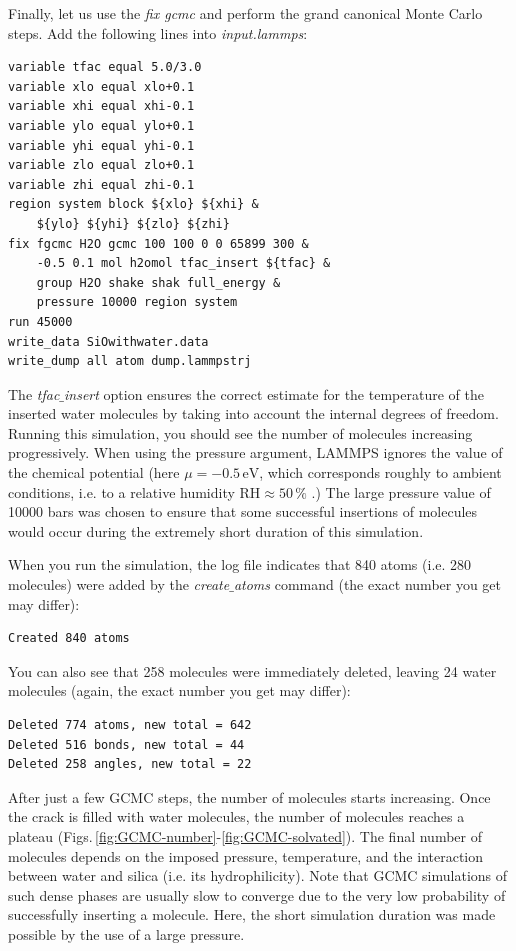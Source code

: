 \documentclass[9pt,tutorial]{livecoms}
\begin{document}
Finally, let us use the \textit{fix gcmc} and perform the grand canonical Monte Carlo steps. Add the following lines into \textit{input.lammps}:
{\normalsize \begin{verbatim}
variable tfac equal 5.0/3.0
variable xlo equal xlo+0.1
variable xhi equal xhi-0.1
variable ylo equal ylo+0.1
variable yhi equal yhi-0.1
variable zlo equal zlo+0.1
variable zhi equal zhi-0.1
region system block ${xlo} ${xhi} &
    ${ylo} ${yhi} ${zlo} ${zhi}
fix fgcmc H2O gcmc 100 100 0 0 65899 300 &
    -0.5 0.1 mol h2omol tfac_insert ${tfac} &
    group H2O shake shak full_energy &
    pressure 10000 region system
run 45000
write_data SiOwithwater.data
write_dump all atom dump.lammpstrj
\end{verbatim}}
The \textit{tfac$\_$insert} option ensures the correct estimate for the temperature of the inserted water molecules by taking into account the internal degrees of freedom. Running this simulation, you should see the number of molecules increasing progressively. When using the pressure argument, LAMMPS ignores the value of the chemical potential (here $\mu = -0.5\,\text{eV}$, which corresponds roughly to ambient conditions, i.e. to a relative humidity $\text{RH} \approx 50\,\%$ \cite{gravelle2020multi}.) The large pressure value of 10000 bars was chosen to ensure that some successful insertions of molecules would occur during the extremely short duration of this simulation.

When you run the simulation, the log file indicates that 840 atoms (i.e. 280 molecules) were added by the \textit{create$\_$atoms} command (the exact number you get may differ):
{\normalsize \begin{verbatim}
Created 840 atoms
\end{verbatim}}
You can also see that 258 molecules were immediately deleted, leaving 24 water molecules (again, the exact number you get may differ):
{\normalsize \begin{verbatim}
Deleted 774 atoms, new total = 642
Deleted 516 bonds, new total = 44
Deleted 258 angles, new total = 22
\end{verbatim}}
After just a few GCMC steps, the number of molecules starts increasing. Once the crack is filled with water molecules, the number of molecules reaches a plateau (Figs.\,\ref{fig:GCMC-number}-\ref{fig:GCMC-solvated}). The final number of molecules depends on the imposed pressure, temperature, and the interaction between water and silica (i.e. its hydrophilicity). Note that GCMC simulations of such dense phases are usually slow to converge due to the
very low probability of successfully inserting a molecule. Here, the short simulation duration was made possible by the use of a large pressure.
\end{document}
